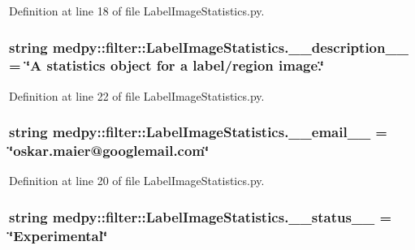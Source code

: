 Definition at line 18 of file LabelImageStatistics.py.

\hypertarget{namespacemedpy_1_1filter_1_1LabelImageStatistics_a9b2d6965b41017f0cba151b0a9b070ab}{
\subsubsection[{\_\-\_\-description\_\-\_\-}]{\setlength{\rightskip}{0pt plus 5cm}string {\bf medpy::filter::LabelImageStatistics.\_\-\_\-description\_\-\_\-} = \char`\"{}A statistics {\bf object} for a label/region image.\char`\"{}}}
\label{namespacemedpy_1_1filter_1_1LabelImageStatistics_a9b2d6965b41017f0cba151b0a9b070ab}


Definition at line 22 of file LabelImageStatistics.py.

\hypertarget{namespacemedpy_1_1filter_1_1LabelImageStatistics_af41c23d7e8bf0e494884a88ac4d34c27}{
\subsubsection[{\_\-\_\-email\_\-\_\-}]{\setlength{\rightskip}{0pt plus 5cm}string {\bf medpy::filter::LabelImageStatistics.\_\-\_\-email\_\-\_\-} = \char`\"{}oskar.maier@googlemail.com\char`\"{}}}
\label{namespacemedpy_1_1filter_1_1LabelImageStatistics_af41c23d7e8bf0e494884a88ac4d34c27}


Definition at line 20 of file LabelImageStatistics.py.

\hypertarget{namespacemedpy_1_1filter_1_1LabelImageStatistics_aec4285ddcc68770264b5bb9b17ce3761}{
\subsubsection[{\_\-\_\-status\_\-\_\-}]{\setlength{\rightskip}{0pt plus 5cm}string {\bf medpy::filter::LabelImageStatistics.\_\-\_\-status\_\-\_\-} = \char`\"{}Experimental\char`\"{}}}
\label{namespacemedpy_1_1filter_1_1LabelImageStatistics_aec4285ddcc68770264b5bb9b17ce3761}


